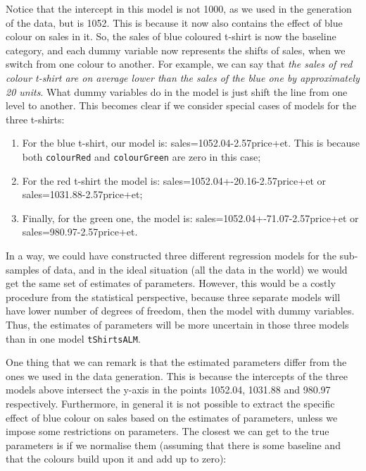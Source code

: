 \documentclass[
]{book}
\providecommand{\tightlist}{%
  \setlength{\itemsep}{0pt}\setlength{\parskip}{0pt}}
\theoremstyle{definition}
\theoremstyle{definition}
\theoremstyle{definition}
\theoremstyle{definition}
\theoremstyle{remark}
\begin{document}
Notice that the intercept in this model is not 1000, as we used in the generation of the data, but is 1052. This is because it now also contains the effect of blue colour on sales in it. So, the sales of blue coloured t-shirt is now the baseline category, and each dummy variable now represents the shifts of sales, when we switch from one colour to another. For example, we can say that \emph{the sales of red colour t-shirt are on average lower than the sales of the blue one by approximately 20 units}. What dummy variables do in the model is just shift the line from one level to another. This becomes clear if we consider special cases of models for the three t-shirts:

\begin{enumerate}
\def\labelenumi{\arabic{enumi}.}
\tightlist
\item
  For the blue t-shirt, our model is: sales=1052.04-2.57price+et. This is because both \texttt{colourRed} and \texttt{colourGreen} are zero in this case;
\item
  For the red t-shirt the model is: sales=1052.04+-20.16-2.57price+et or sales=1031.88-2.57price+et;
\item
  Finally, for the green one, the model is: sales=1052.04+-71.07-2.57price+et or sales=980.97-2.57price+et.
\end{enumerate}

In a way, we could have constructed three different regression models for the sub-samples of data, and in the ideal situation (all the data in the world) we would get the same set of estimates of parameters. However, this would be a costly procedure from the statistical perspective, because three separate models will have lower number of degrees of freedom, then the model with dummy variables. Thus, the estimates of parameters will be more uncertain in those three models than in one model \texttt{tShirtsALM}.

One thing that we can remark is that the estimated parameters differ from the ones we used in the data generation. This is because the intercepts of the three models above intersect the y-axis in the points 1052.04, 1031.88 and 980.97 respectively. Furthermore, in general it is not possible to extract the specific effect of blue colour on sales based on the estimates of parameters, unless we impose some restrictions on parameters. The closest we can get to the true parameters is if we normalise them (assuming that there is some baseline and that the colours build upon it and add up to zero):
\end{document}
